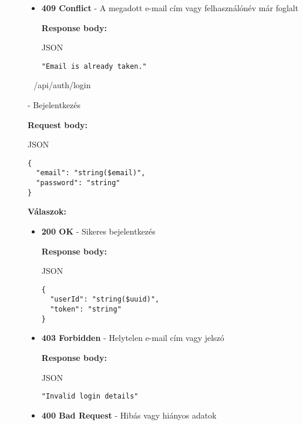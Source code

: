 \documentclass[12pt]{report}
\newcommand{\httpPost}[1]{\colorbox{postColor}{\textbf{\textcolor{white}{POST}}}~#1}
\begin{document}
\begin{description}
\begin{itemize}
      \item \textbf{409 Conflict} - A megadott e-mail cím vagy felhasználónév már foglalt
        
        \textbf{Response body:}
        \begin{codeblock}{JSON}
          \begin{verbatim}
"Email is already taken."
          \end{verbatim}
        \end{codeblock}
    \end{itemize}

  \item [\httpPost{/api/auth/login}] - Bejelentkezés
  
    \vspace{0.5cm}
    \textbf{Request body:}
    \begin{codeblock}{JSON}
      \begin{verbatim}
{
  "email": "string($email)",
  "password": "string"
}
      \end{verbatim}
    \end{codeblock}

    \vspace{0.5cm}
    \textbf{Válaszok:}
    \begin{itemize}
      \item \textbf{200 OK} - Sikeres bejelentkezés
      
        \textbf{Response body:}
        \begin{codeblock}{JSON}
          \begin{verbatim}
{
  "userId": "string($uuid)",
  "token": "string"
}
          \end{verbatim}
        \end{codeblock}
      \item \textbf{403 Forbidden} - Helytelen e-mail cím vagy jelszó

        \textbf{Response body:}
        \begin{codeblock}{JSON}
          \begin{verbatim}
"Invalid login details"
          \end{verbatim}
        \end{codeblock}

      \item \textbf{400 Bad Request} - Hibás vagy hiányos adatok
    \end{itemize}

\end{description}
\end{document}
